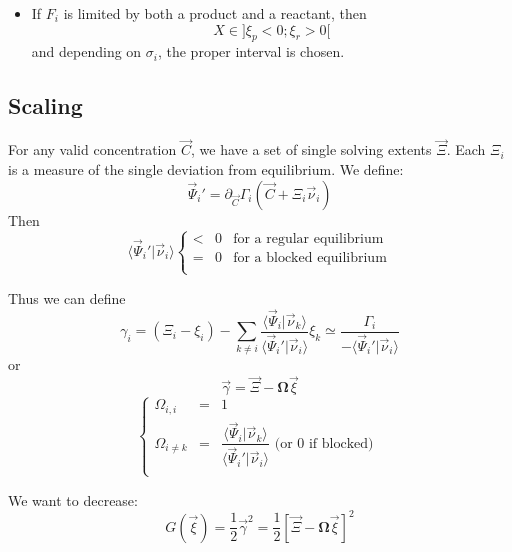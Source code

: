 \documentclass[aps,12pt]{revtex4}
\begin{document}
\begin{itemize}
\begin{itemize}
	\item If $F_i$ is limited by both a product and a reactant, then $$X\in\rbrack \xi_p < 0 ; \xi_r > 0 \lbrack$$
	and depending on $\sigma_i$, the proper interval is chosen.
	\end{itemize}
	
\end{itemize}

\subsection{Scaling}

For any valid concentration $\vec{C}$, we have a set of single solving extents $\vec{\Xi}$.
Each $\Xi_i$ is a measure of the single deviation from equilibrium.
We define:
\begin{equation}
	\vec{\Psi}_i' = \partial_{\vec{C}}\Gamma_i(\vec{C} + \Xi_i \vec{\nu}_i)
\end{equation}
Then
\begin{equation}
	\langle \vec{\Psi}_i'\vert \vec{\nu}_i \rangle 
	\left\lbrace
	\begin{array}{rcl}
	 < & 0 & \text{for a regular equilibrium} \\
	 = & 0 & \text{for a blocked equilibrium} \\
	\end{array}
	\right.
\end{equation}

Thus we can define 
\begin{equation}
	\gamma_i = \left(\Xi_i - \xi_i\right) - \sum_{k\not=i} \dfrac{\langle \vec{\Psi}_i\vert \vec{\nu}_k\rangle}{\langle \vec{\Psi}_i'\vert \vec{\nu}_i \rangle} \xi_k
	\simeq \dfrac{\Gamma_i}{-\langle \vec{\Psi}_i'\vert \vec{\nu}_i \rangle} 
\end{equation}
or
\begin{equation}
	\vec{\gamma} = \vec{\Xi} - \bm{\Omega} \vec{\xi}
\end{equation}
\begin{equation}
\left\lbrace
\begin{array}{rcl}
	\Omega_{i,i} & = &1\\
	\Omega_{i\not=k} & = & \dfrac{\langle \vec{\Psi}_i\vert \vec{\nu}_k\rangle}{\langle \vec{\Psi}_i'\vert \vec{\nu}_i \rangle} \text{ (or 0 if blocked) }\\
\end{array}
\right.
\end{equation}
 
We want to decrease:
\begin{equation}
	G(\vec{\xi}) = \dfrac{1}{2}\vec{\gamma}^2 = \dfrac{1}{2} \left[ \vec{\Xi} - \bm{\Omega} \vec{\xi} \right]^2
\end{equation}
\end{document}
